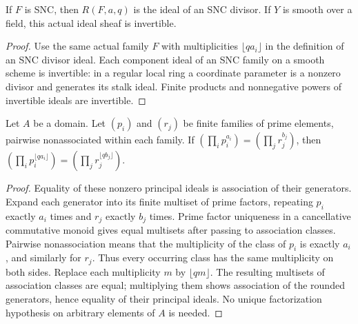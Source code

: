 \begin{lemma}
\label{lem:rounded-snc-original-invertible}
\leanok
If $F$ is SNC, then $R(F,a,q)$ is the ideal of an SNC divisor. If $Y$ is
smooth over a field, this actual ideal sheaf is invertible.
\end{lemma}
\begin{proof}
Use the same actual family $F$ with multiplicities $\lfloor qa_i\rfloor$
in the definition of an SNC divisor ideal. Each component ideal of an SNC
family on a smooth scheme is invertible: in a regular local ring a
coordinate parameter is a nonzero divisor and generates its stalk ideal.
Finite products and nonnegative powers of invertible ideals are invertible.
\end{proof}

\begin{lemma}
\label{lem:rounded-snc-prime-monomial-independent}
\leanok
Let $A$ be a domain. Let $(p_i)$ and $(r_j)$ be finite families of prime
elements, pairwise nonassociated within each family. If
$(\prod_i p_i^{a_i})=(\prod_j r_j^{b_j})$, then
$(\prod_i p_i^{\lfloor qa_i\rfloor})=(\prod_j r_j^{\lfloor qb_j\rfloor})$.
\end{lemma}
\begin{proof}
Equality of these nonzero principal ideals is association of their
generators. Expand each generator into its finite multiset of prime
factors, repeating $p_i$ exactly $a_i$ times and $r_j$ exactly $b_j$ times.
Prime factor uniqueness in a cancellative commutative monoid gives equal
multisets after passing to association classes. Pairwise nonassociation
means that the multiplicity of the class of $p_i$ is exactly $a_i$, and
similarly for $r_j$. Thus every occurring class has the same multiplicity
on both sides. Replace each multiplicity $m$ by $\lfloor qm\rfloor$.
The resulting multisets of association classes are equal; multiplying them
shows association of the rounded generators, hence equality of their
principal ideals. No unique factorization hypothesis on arbitrary
elements of $A$ is needed.
\end{proof}

